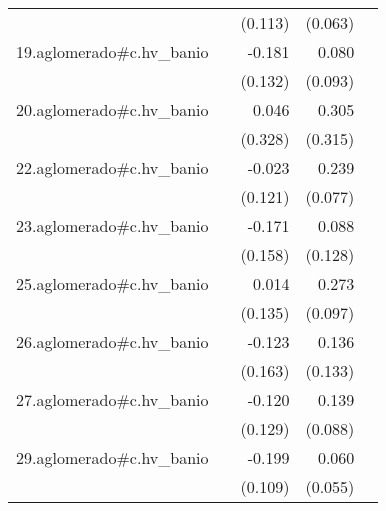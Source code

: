 {\begin{longtable}{l*{4}{D{.}{.}{-1}}}
            &                     &     (0.113)         &     (0.063)         &                     \\
\addlinespace
19.aglomerado#c.hv\_banio&                     &      -0.181         &       0.080         &                     \\
            &                     &     (0.132)         &     (0.093)         &                     \\
\addlinespace
20.aglomerado#c.hv\_banio&                     &       0.046         &       0.305         &                     \\
            &                     &     (0.328)         &     (0.315)         &                     \\
\addlinespace
22.aglomerado#c.hv\_banio&                     &      -0.023         &       0.239\sym{**} &                     \\
            &                     &     (0.121)         &     (0.077)         &                     \\
\addlinespace
23.aglomerado#c.hv\_banio&                     &      -0.171         &       0.088         &                     \\
            &                     &     (0.158)         &     (0.128)         &                     \\
\addlinespace
25.aglomerado#c.hv\_banio&                     &       0.014         &       0.273\sym{**} &                     \\
            &                     &     (0.135)         &     (0.097)         &                     \\
\addlinespace
26.aglomerado#c.hv\_banio&                     &      -0.123         &       0.136         &                     \\
            &                     &     (0.163)         &     (0.133)         &                     \\
\addlinespace
27.aglomerado#c.hv\_banio&                     &      -0.120         &       0.139         &                     \\
            &                     &     (0.129)         &     (0.088)         &                     \\
\addlinespace
29.aglomerado#c.hv\_banio&                     &      -0.199         &       0.060         &                     \\
            &                     &     (0.109)         &     (0.055)         &                     \\

\end{longtable}}
